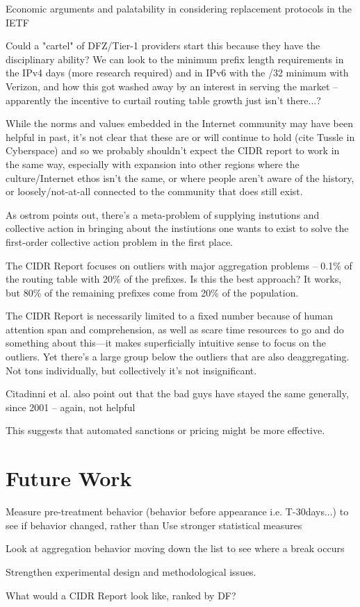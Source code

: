 Economic arguments and palatability in considering replacement protocols in the
IETF

Could a "cartel" of DFZ/Tier-1 providers start this because they have the
disciplinary ability? We can look to the minimum prefix length requirements in
the IPv4 days (more research required) and in IPv6 with the /32 minimum with
Verizon, and how this got washed away by an interest in serving the market --
apparently the incentive to curtail routing table growth just isn't there...?

While the norms and values embedded in the Internet community may have been
helpful in past, it's not clear that these are or will continue to hold (cite
Tussle in Cyberspace) and so we probably shouldn't expect the CIDR report to
work in the same way, especially with expansion into other regions where the
culture/Internet ethos isn't the same, or where people aren't aware of the
history, or loosely/not-at-all connected to the community that does still
exist.

As ostrom points out, there's a meta-problem of supplying instutions and
collective action in bringing about the instiutions one wants to exist to solve
the first-order collective action problem in the first place.

The CIDR Report focuses on outliers with major aggregation problems -- 0.1\% of
the routing table with 20\% of the prefixes. Is this the best approach? It
works, but 80\% of the remaining prefixes come from 20\% of the population.

The CIDR Report is necessarily limited to a fixed number because of human
attention span and comprehension, as well as scare time resources to go and do
something about this---it makes superficially intuitive sense to focus on the
outliers. Yet there's a large group below the outliers that are also
deaggregating. Not tons individually, but collectively it's not insignificant.

Citadinni et al. also point out that the bad guys have stayed the same
generally, since 2001 -- again, not helpful

This suggests that automated sanctions or pricing might be more effective.

\section{Future Work}
Measure pre-treatment behavior (behavior before appearance i.e. T-30days...) to
see if behavior changed, rather than Use stronger statistical measures

Look at aggregation behavior moving down the list to see where a break occurs

Strengthen experimental design and methodological issues.

What would a CIDR Report look like, ranked by DF?
